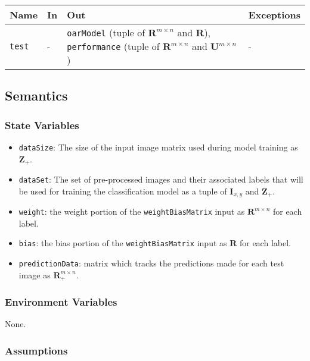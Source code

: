 \documentclass[12pt, titlepage]{article}
\def\code#1{\texttt{#1}}
\begin{document}
\begin{center}
\begin{tabular}{p{2cm} p{4cm} p{4cm} p{2cm}}
\hline
\textbf{Name} & \textbf{In} & \textbf{Out} & \textbf{Exceptions} \\
\hline
\code{test} & - & \code{oarModel} (tuple of $\mathbf{R}^{m \times n}$ and $\mathbf{R}$), \code{performance} (tuple of $\mathbf{R}^{m \times n}$ and $\mathbf{U}^{m \times n}$) & - \\
\hline
\end{tabular}
\end{center}

\subsection{Semantics}

\subsubsection{State Variables}

\begin{itemize}
  \item \code{dataSize}: The size of the input image matrix used during model training as $\mathbf{Z}_{+}$.
  \item \code{dataSet}: The set of pre-processed images and their associated labels that will be used for training the classification model as a tuple of $\mathbf{I}_{x,y}$ and $\mathbf{Z}_{+}$.
  \item \code{weight}: the weight portion of the \code{weightBiasMatrix} input as $\mathbf{R}^{m \times n}$ for each label.
  \item \code{bias}: the bias portion of the \code{weightBiasMatrix} input as $\mathbf{R}$ for each label.
  \item \code{predictionData}: matrix which tracks the predictions made for each test image as $\mathbf{R}_{+}^{m \times n}$.
\end{itemize}

\subsubsection{Environment Variables}

None.

\subsubsection{Assumptions}
\end{document}
